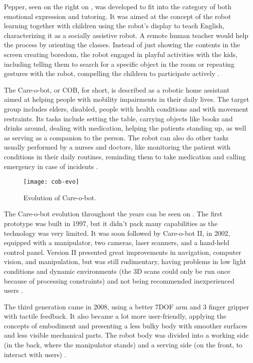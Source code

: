 Pepper, seen on the right on , was developed to fit into the category of both emotional expression and tutoring. It was aimed at the concept of the robot learning together with children using the robot's display to teach English, characterizing it as a socially assistive robot. A remote human teacher would help the process by orienting the classes. Instead of just showing the contents in the screen creating boredom, the robot engaged in playful activities with the kids, including telling them to search for a specific object in the room or repeating gestures with the robot, compelling the children to participate actively \cite{tanaka2015pepper}.

The Care-o-bot, or COB, for short, is described as a robotic home assistant aimed at helping people with mobility impairments in their daily lives. The target group includes elders, disabled, people with health conditions and with movement restraints. Its tasks include setting the table, carrying objects like books and drinks around, dealing with medication, helping the patients standing up, as well as serving as a companion to the person. The robot can also do other tasks usually performed by a nurses and doctors, like monitoring the patient with conditions in their daily routines, reminding them to take medication and calling emergency in case of incidents \cite{graf2004care}.

\begin{figure}[!ht]
    \centering
    \texttt{[image: cob-evo]}
    \caption{Evolution of Care-o-bot.}
    \label{fig:cob-evo}
\end{figure}

The Care-o-bot evolution throughout the years can be seen on . The first prototype was built in 1997, but it didn't pack many capabilities as the technology was very limited. It was soon followed by Care-o-bot II, in 2002, equipped with a manipulator, two cameras, laser scanners, and a hand-held control panel. Version II presented great improvements in navigation, computer vision, and manipulation, but was still rudimentary, having problems in low light conditions and dynamic environments (the 3D scans could only be run once because of processing constraints) and not being recommended inexperienced users \cite{graf2004care}.

The third generation came in 2008, using a better 7DOF arm and 3 finger gripper with tactile feedback. It also became a lot more user-friendly, applying the concepts of embodiment and presenting a less bulky body with smoother surfaces and less visible mechanical parts. The robot body was divided into a working side (in the back, where the manipulator stands) and a serving side (on the front, to interact with users) \cite{graf2009robotic}.

